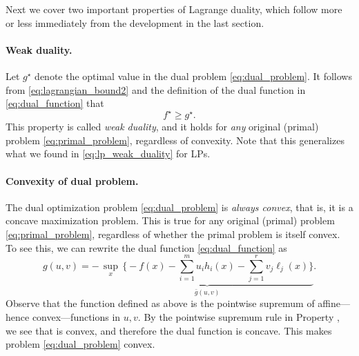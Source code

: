 Next we cover two important properties of Lagrange duality, which follow
more or less immediately from the development in the last section.

\paragraph{Weak duality.}

Let $g^\star$ denote the optimal value in the dual problem
\eqref{eq:dual_problem}. It follows from \eqref{eq:lagrangian_bound2} and the   
definition of the dual function in \eqref{eq:dual_function} that  
\begin{equation}
\label{eq:weak_duality}
f^\star \geq g^\star.
\end{equation}
This property is called \emph{weak duality}, and it holds for \emph{any}
original (primal) problem \eqref{eq:primal_problem}, regardless of
convexity. Note that this generalizes what we found in
\eqref{eq:lp_weak_duality} for LPs. 

\paragraph{Convexity of dual problem.}

The dual optimization problem \eqref{eq:dual_problem} is \emph{always convex},
that is, it is a concave maximization problem. This is true for any original
(primal) problem \eqref{eq:primal_problem}, regardless of whether the primal
problem is itself convex. To see this, we can rewrite the dual function
\eqref{eq:dual_function} as   
\[
g(u,v) = - \, \underbrace{\sup_x \, \bigg\{ -f(x) - \sum_{i=1}^m u_i h_i(x) - 
  \sum_{j=1}^r v_j \ell_j(x) \bigg\}}_{\bar{g}(u,v)}.
\]
Observe that the function defined as  above is the pointwise 
supremum of affine---hence convex---functions in $u,v$. By the pointwise
supremum rule in Property , we see that
 is convex, and therefore the dual function  is concave. This makes problem \eqref{eq:dual_problem} convex.     

\medskip

